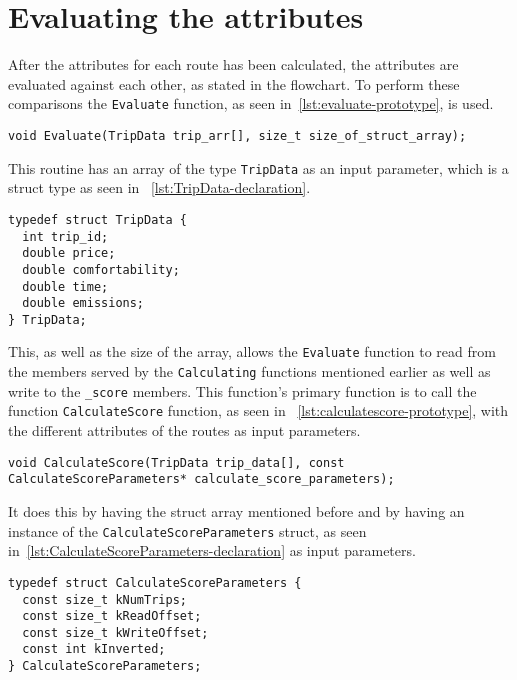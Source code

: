 \section{Evaluating the attributes}\label{sec:evaluating-the-attributes}

After the attributes for each route has been calculated, the attributes are evaluated against each other, as stated in
the flowchart.
To perform these comparisons the \texttt{Evaluate} function, as seen in~\ref{lst:evaluate-prototype}, is used.

\begin{lstlisting}[caption={Function prototype for \texttt{Evaluate}}, label={lst:evaluate-prototype}]
void Evaluate(TripData trip_arr[], size_t size_of_struct_array);
\end{lstlisting}

This routine has an array of the type \texttt{TripData} as an input parameter, which is a struct type as seen in
~\ref{lst:TripData-declaration}.

\begin{lstlisting}[caption={Declaration of \texttt{TripData} struct}, label={lst:TripData-declaration}]
typedef struct TripData {
  int trip_id;
  double price;
  double comfortability;
  double time;
  double emissions;
} TripData;
\end{lstlisting}

This, as well as the size of the array, allows the \texttt{Evaluate} function to read from the members served by the
\texttt{Calculating} functions mentioned earlier as well as write to the \texttt{\_score} members.
This function's primary function is to call the function \texttt{CalculateScore} function, as seen in
~\ref{lst:calculatescore-prototype}, with the different attributes of the routes as input parameters.

\begin{lstlisting}[caption={Function prototype for \texttt{CalculateScore}}, label={lst:calculatescore-prototype}]
void CalculateScore(TripData trip_data[], const CalculateScoreParameters* calculate_score_parameters);
\end{lstlisting}

It does this by having the struct array mentioned before and by having an instance of the
\texttt{CalculateScoreParameters} struct, as seen in~\ref{lst:CalculateScoreParameters-declaration} as input parameters.

\begin{lstlisting}[caption={Declaration of \texttt{CalculateScoreParameters} struct},
    label={lst:CalculateScoreParameters-declaration}]
typedef struct CalculateScoreParameters {
  const size_t kNumTrips;
  const size_t kReadOffset;
  const size_t kWriteOffset;
  const int kInverted;
} CalculateScoreParameters;
\end{lstlisting}

